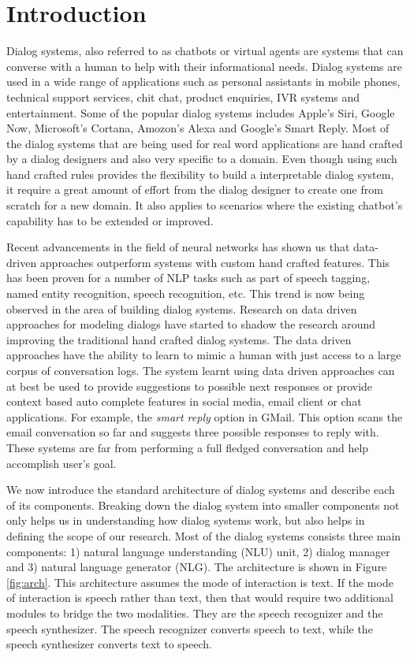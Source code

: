 \section{Introduction}
\label{sec:intro}
Dialog systems, also referred to as chatbots or virtual agents are systems that can converse with a human to help with their informational needs. Dialog systems are used in a wide range of applications such as personal assistants in mobile phones, technical support services, chit chat, product enquiries, IVR systems and entertainment. Some of the popular dialog systems includes Apple's Siri, Google Now, Microsoft's Cortana, Amozon's Alexa and Google's Smart Reply. Most of the dialog systems that are being used for real word applications are hand crafted by a dialog designers and also very specific to a domain. Even though using such hand crafted rules provides the flexibility to build a interpretable dialog system, it require a great amount of effort from the dialog designer to create one from scratch for a new domain. It also applies to scenarios where the existing chatbot's capability has to be extended or improved.

Recent advancements in the field of neural networks has shown us that data-driven approaches outperform systems with custom hand crafted features. This has been proven for a number of NLP tasks such as part of speech tagging, named entity recognition, speech recognition, etc. This trend is now being observed in the area of building dialog systems. Research on data driven approaches for modeling dialogs have started to shadow the research around improving the traditional hand crafted dialog systems. The data driven approaches have the ability to learn to mimic a human with just access to a large corpus of conversation logs. The system learnt using data driven approaches can at best be used to provide suggestions to possible next responses or provide context based auto complete features in social media, email client or chat applications. For example, the \textit{smart reply} option in GMail. This option scans the email conversation so far and suggests three possible responses to reply with. These systems are far from performing a full fledged conversation and help accomplish user's goal.

We now introduce the standard architecture of dialog systems and describe each of its components. Breaking down the dialog system into smaller components not only helps us in understanding how dialog systems work, but also helps in defining the scope of our research. Most of the dialog systems consists three main components: 1) natural language understanding (NLU) unit, 2) dialog manager and 3) natural language generator (NLG). The architecture is shown in Figure \ref{fig:arch}. This architecture assumes the mode of interaction is text. If the mode of interaction is speech rather than text, then that would require two additional modules to bridge the two modalities. They are the speech recognizer and the speech synthesizer. The speech recognizer converts speech to text, while the speech synthesizer converts text to speech.

